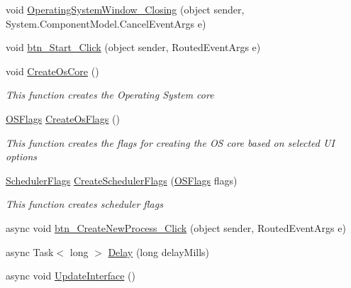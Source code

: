 \begin{DoxyCompactItemize}
\item 
void \hyperlink{class_c_p_u___o_s___simulator_1_1_operating_system_main_window_a5e823b50dfab668d8e61d9d3ecea300c}{Operating\+System\+Window\+\_\+\+Closing} (object sender, System.\+Component\+Model.\+Cancel\+Event\+Args e)
\item 
void \hyperlink{class_c_p_u___o_s___simulator_1_1_operating_system_main_window_a49ee2facd64a57c8a3450ccd5582dfff}{btn\+\_\+\+Start\+\_\+\+Click} (object sender, Routed\+Event\+Args e)
\item 
void \hyperlink{class_c_p_u___o_s___simulator_1_1_operating_system_main_window_a61584b7f34a107e1c8c6cbbaff17641d}{Create\+Os\+Core} ()
\begin{DoxyCompactList}\small\item\em This function creates the Operating System core \end{DoxyCompactList}\item 
\hyperlink{struct_c_p_u___o_s___simulator_1_1_operating___system_1_1_o_s_flags}{O\+S\+Flags} \hyperlink{class_c_p_u___o_s___simulator_1_1_operating_system_main_window_aedcaa8273429f3867b3a2419981e4ca1}{Create\+Os\+Flags} ()
\begin{DoxyCompactList}\small\item\em This function creates the flags for creating the O\+S core based on selected U\+I options \end{DoxyCompactList}\item 
\hyperlink{struct_c_p_u___o_s___simulator_1_1_operating___system_1_1_scheduler_flags}{Scheduler\+Flags} \hyperlink{class_c_p_u___o_s___simulator_1_1_operating_system_main_window_affe29a16b5dcb4faa896fd12b87268f6}{Create\+Scheduler\+Flags} (\hyperlink{struct_c_p_u___o_s___simulator_1_1_operating___system_1_1_o_s_flags}{O\+S\+Flags} flags)
\begin{DoxyCompactList}\small\item\em This function creates scheduler flags \end{DoxyCompactList}\item 
async void \hyperlink{class_c_p_u___o_s___simulator_1_1_operating_system_main_window_a07752984a7eedac5dab517b7f57b9af2}{btn\+\_\+\+Create\+New\+Process\+\_\+\+Click} (object sender, Routed\+Event\+Args e)
\item 
async Task$<$ long $>$ \hyperlink{class_c_p_u___o_s___simulator_1_1_operating_system_main_window_a981c8ed38feb78ab874753c641d278d6}{Delay} (long delay\+Mills)
\item 
async void \hyperlink{class_c_p_u___o_s___simulator_1_1_operating_system_main_window_a531d8240782c578c6fc5984c703ddffb}{Update\+Interface} ()

\end{DoxyCompactItemize}
